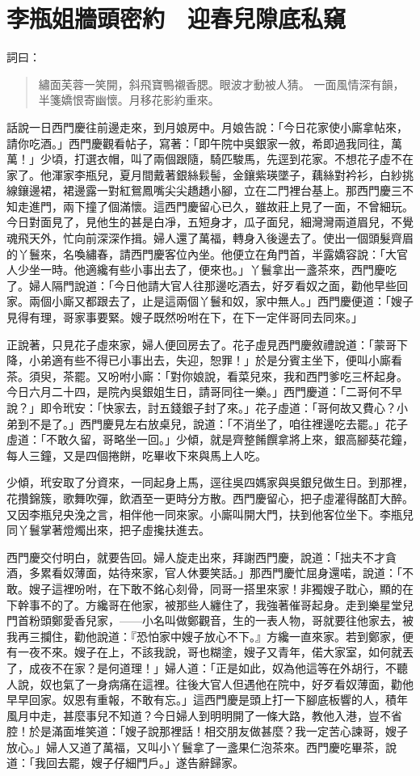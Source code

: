 
\chapter{李瓶姐牆頭密約　迎春兒隙底私窺}

詞曰：
\begin{quote}
繡面芙蓉一笑開，斜飛寶鴨襯香腮。眼波才動被人猜。
一面風情深有韻，半箋嬌恨寄幽懷。月移花影約重來。
\end{quote}

話說一日西門慶往前邊走來，到月娘房中。月娘告說：「今日花家使小廝拿帖來，請你吃酒。」西門慶觀看帖子，寫著：「即午院中吳銀家一敘，希即過我同往，萬萬！」少頃，打選衣帽，叫了兩個跟隨，騎匹駿馬，先逕到花家。不想花子虛不在家了。他渾家李瓶兒，夏月間戴著銀絲鬏髻，金鑲紫瑛墜子，藕絲對衿衫，白紗挑線鑲邊裙，裙邊露一對紅鴛鳳嘴尖尖趫趫小腳，立在二門裡台基上。那西門慶三不知走進門，兩下撞了個滿懷。這西門慶留心已久，雖故莊上見了一面，不曾細玩。今日對面見了，見他生的甚是白凈，五短身才，瓜子面兒，細灣灣兩道眉兒，不覺魂飛天外，忙向前深深作揖。婦人還了萬福，轉身入後邊去了。使出一個頭髮齊眉的丫鬟來，名喚繡春，請西門慶客位內坐。他便立在角門首，半露嬌容說：「大官人少坐一時。他適纔有些小事出去了，便來也。」丫鬟拿出一盞茶來，西門慶吃了。婦人隔門說道：「今日他請大官人往那邊吃酒去，好歹看奴之面，勸他早些回家。兩個小廝又都跟去了，止是這兩個丫鬟和奴，家中無人。」西門慶便道：「嫂子見得有理，哥家事要緊。嫂子既然吩咐在下，在下一定伴哥同去同來。」

正說著，只見花子虛來家，婦人便回房去了。花子虛見西門慶敘禮說道：「蒙哥下降，小弟適有些不得已小事出去，失迎，恕罪！」於是分賓主坐下，便叫小廝看茶。須臾，茶罷。又吩咐小廝：「對你娘說，看菜兒來，我和西門爹吃三杯起身。今日六月二十四，是院內吳銀姐生日，請哥同往一樂。」西門慶道：「二哥何不早說？」即令玳安：「快家去，討五錢銀子封了來。」花子虛道：「哥何故又費心？小弟到不是了。」西門慶見左右放桌兒，說道：「不消坐了，咱往裡邊吃去罷。」花子虛道：「不敢久留，哥略坐一回。」少傾，就是齊整餚饌拿將上來，銀高腳葵花鐘，每人三鐘，又是四個捲餅，吃畢收下來與馬上人吃。

少傾，玳安取了分資來，一同起身上馬，逕往吳四媽家與吳銀兒做生日。到那裡，花攢錦簇，歌舞吹彈，飲酒至一更時分方散。西門慶留心，把子虛灌得酩酊大醉。又因李瓶兒央浼之言，相伴他一同來家。小廝叫開大門，扶到他客位坐下。李瓶兒同丫鬟掌著燈燭出來，把子虛攙扶進去。

西門慶交付明白，就要告回。婦人旋走出來，拜謝西門慶，說道：「拙夫不才貪酒，多累看奴薄面，姑待來家，官人休要笑話。」那西門慶忙屈身還喏，說道：「不敢。嫂子這裡吩咐，在下敢不銘心刻骨，同哥一搭里來家！非獨嫂子耽心，顯的在下幹事不的了。方纔哥在他家，被那些人纏住了，我強著催哥起身。走到樂星堂兒門首粉頭鄭愛香兒家，——小名叫做鄭觀音，生的一表人物，哥就要往他家去，被我再三攔住，勸他說道：『恐怕家中嫂子放心不下。』方纔一直來家。若到鄭家，便有一夜不來。嫂子在上，不該我說，哥也糊塗，嫂子又青年，偌大家室，如何就丟了，成夜不在家？是何道理！」婦人道：「正是如此，奴為他這等在外胡行，不聽人說，奴也氣了一身病痛在這裡。往後大官人但遇他在院中，好歹看奴薄面，勸他早早回家。奴恩有重報，不敢有忘。」這西門慶是頭上打一下腳底板響的人，積年風月中走，甚麼事兒不知道？今日婦人到明明開了一條大路，教他入港，豈不省腔！於是滿面堆笑道：「嫂子說那裡話！相交朋友做甚麼？我一定苦心諫哥，嫂子放心。」婦人又道了萬福，又叫小丫鬟拿了一盞果仁泡茶來。西門慶吃畢茶，說道：「我回去罷，嫂子仔細門戶。」遂告辭歸家。

